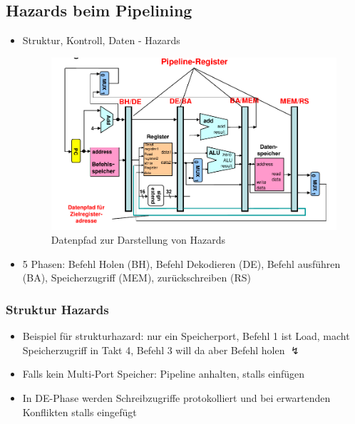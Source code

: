 \subsection{Hazards beim Pipelining}
\begin{itemize}
	\item
		Struktur, Kontroll, Daten - Hazards
		\begin{figure}[hpbt]
			\centering
			\includegraphics[width=1.1\textwidth]{img/datenpfad.png}
			\caption{Datenpfad zur Darstellung von Hazards}
			\label{fig:hazards}
		\end{figure}
	\item
		5 Phasen: Befehl Holen (BH), Befehl Dekodieren (DE),  Befehl ausführen (BA), Speicherzugriff (MEM), zurückschreiben (RS)
\end{itemize}


\subsubsection{Struktur Hazards}
\begin{itemize}
	\item
		Beispiel für strukturhazard: nur ein Speicherport, Befehl 1 ist Load, macht Speicherzugriff in Takt 4, Befehl 3 will da aber Befehl holen $\lightning$
	\item
		Falls kein Multi-Port Speicher: Pipeline anhalten, stalls einfügen
	\item
		In DE-Phase werden Schreibzugriffe protokolliert und bei erwartenden Konflikten stalls eingefügt

\end{itemize}
